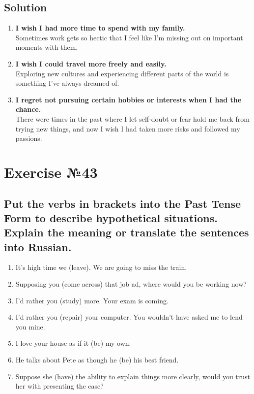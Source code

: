 \subsection*{Solution}
\begin{enumerate}
      \item \textbf{I wish I had more time to spend with my family.} \\
            Sometimes work gets so hectic that I feel like I'm missing out on important moments with them.

      \item \textbf{I wish I could travel more freely and easily.} \\
            Exploring new cultures and experiencing different parts of the world is something I've always dreamed of.

      \item \textbf{I regret not pursuing certain hobbies or interests when I had the chance.} \\
            There were times in the past where I let self-doubt or fear hold me back from trying new things, and now I wish I had taken more risks and followed my passions.
\end{enumerate}

\section{Exercise №43}
\subsection*{Put the verbs in brackets into the Past Tense Form to describe hypothetical situations.
      Explain the meaning or translate the sentences into Russian.}
\begin{enumerate}
      \item It’s high time we \underline{\hspace{2cm}} (leave). We are going to miss the train.
      \item Supposing you \underline{\hspace{2cm}} (come across) that job ad, where would you be working now?
      \item I’d rather you \underline{\hspace{2cm}} (study) more. Your exam is coming.
      \item I’d rather you \underline{\hspace{2cm}} (repair) your computer. You wouldn’t have asked me to lend you mine.
      \item I love your house as if it \underline{\hspace{2cm}} (be) my own.
      \item He talks about Pete as though he \underline{\hspace{2cm}} (be) his best friend.
      \item Suppose she \underline{\hspace{2cm}} (have) the ability to explain things more clearly, would you trust her with presenting the case?
\end{enumerate}

